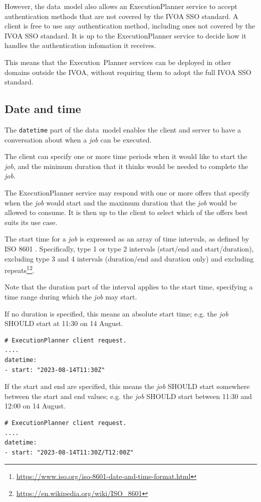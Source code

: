 \documentclass[11pt,a4paper]{ivoa}
\newcommand{\datamodel} {data~model}
\newcommand{\ivoa} {IVOA}
\newcommand{\execplanner} {ExecutionPlanner}
\newcommand{\executionplanner} {Execution~Planner}
\newcommand{\codeword}[1] {\texttt{#1}}
\newcommand{\footurl}[1] {\footnote{\url{#1}}}
\newcommand{\job} {\textit{job}}
\begin{document}
However, the \datamodel{} also allows an \execplanner{} service to accept authentication
methods that are not covered by the \ivoa{} SSO standard.
A client is free to use any authentication method, including ones not covered by the
\ivoa{} SSO standard. It is up to the \execplanner{} service to decide how it
handles the authentication infomation it receives.

This means that the \executionplanner{} services can be deployed in other domains outside the \ivoa{},
without requiring them to adopt the full \ivoa{} SSO standard.

\subsection{Date and time}
\label{date-time}

The \codeword{datetime} part of the \datamodel{} enables the client and server to have a
conversation about when a \job{} can be executed.

The client can specify one or more time periods when it would like to start the \job{},
and the minimum duration that it thinks would be needed to complete the \job{}.

The \execplanner{} service may respond with one or more offers that specify when the \job{}
would start and the maximum duration that the \job{} would be allowed to consume.
It is then up to the client to select which of the offers best suits its use case.

The start time for a \job{} is expressed as an array of time intervals, as defined by
ISO 8601 \citep{std:iso8601}.
Specifically, type 1 or type 2 intervals (start/end and start/duration), excluding type 3 and 4 intervals
(duration/end and duration only) and excluding
repeats\footurl{https://www.iso.org/iso-8601-date-and-time-format.html}\footurl{https://en.wikipedia.org/wiki/ISO_8601}.

Note that the duration part of the interval applies to the start time, specifying a
time range during which the \job{} may start.

If no duration is specified, this means an absolute start time;
e.g. the \job{} SHOULD start at 11:30 on 14 August.
\begin{lstlisting}[]
# ExecutionPlanner client request.
....
datetime:
- start: "2023-08-14T11:30Z"
\end{lstlisting}

If the start and end are specified, this means the \job{} SHOULD start somewhere between
the start and end values;
e.g. the \job{} SHOULD start between 11:30 and 12:00 on 14 August.
\begin{lstlisting}[]
# ExecutionPlanner client request.
....
datetime:
- start: "2023-08-14T11:30Z/T12:00Z"
\end{lstlisting}
\end{document}
